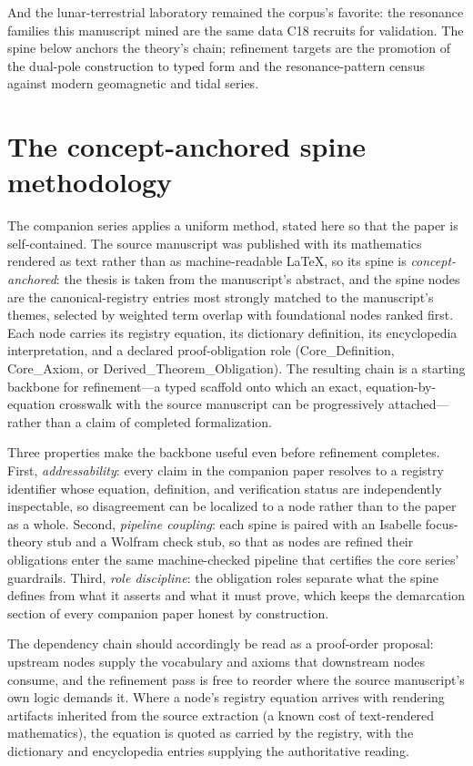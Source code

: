 \documentclass[11pt]{article}
\theoremstyle{remark}
\begin{document}
And the lunar-terrestrial laboratory remained the corpus's favorite: the resonance families this manuscript mined are the same data C18 recruits for validation. The spine below anchors the theory's chain; refinement targets are the promotion of the dual-pole construction to typed form and the resonance-pattern census against modern geomagnetic and tidal series.

\section{The concept-anchored spine methodology}
\label{sec:method}

The companion series applies a uniform method, stated here so that the paper is self-contained. The source manuscript was published with its mathematics rendered as text rather than as machine-readable LaTeX, so its spine is \emph{concept-anchored}: the thesis is taken from the manuscript's abstract, and the spine nodes are the canonical-registry entries most strongly matched to the manuscript's themes, selected by weighted term overlap with foundational nodes ranked first. Each node carries its registry equation, its dictionary definition, its encyclopedia interpretation, and a declared proof-obligation role (Core\_Definition, Core\_Axiom, or Derived\_Theorem\_Obligation). The resulting chain is a starting backbone for refinement---a typed scaffold onto which an exact, equation-by-equation crosswalk with the source manuscript can be progressively attached---rather than a claim of completed formalization.

Three properties make the backbone useful even before refinement completes. First, \emph{addressability}: every claim in the companion paper resolves to a registry identifier whose equation, definition, and verification status are independently inspectable, so disagreement can be localized to a node rather than to the paper as a whole. Second, \emph{pipeline coupling}: each spine is paired with an Isabelle focus-theory stub and a Wolfram check stub, so that as nodes are refined their obligations enter the same machine-checked pipeline that certifies the core series' guardrails. Third, \emph{role discipline}: the obligation roles separate what the spine defines from what it asserts and what it must prove, which keeps the demarcation section of every companion paper honest by construction.

The dependency chain should accordingly be read as a proof-order proposal: upstream nodes supply the vocabulary and axioms that downstream nodes consume, and the refinement pass is free to reorder where the source manuscript's own logic demands it. Where a node's registry equation arrives with rendering artifacts inherited from the source extraction (a known cost of text-rendered mathematics), the equation is quoted as carried by the registry, with the dictionary and encyclopedia entries supplying the authoritative reading.
\end{document}
